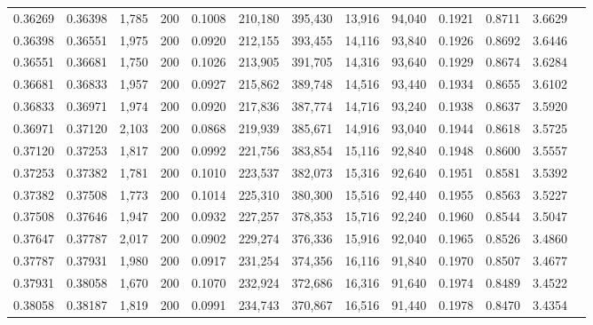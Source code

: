 \begin{tabular}{rrrrrrrrrrrrr}
0.36269 & 0.36398 & 1,785 & 200 &                                     0.1008 & 210,180 & 395,430 &  13,916 &  94,040 & 0.1921 & 0.8711 & 3.6629 \\
0.36398 & 0.36551 & 1,975 & 200 &                                     0.0920 & 212,155 & 393,455 &  14,116 &  93,840 & 0.1926 & 0.8692 & 3.6446 \\
0.36551 & 0.36681 & 1,750 & 200 &                                     0.1026 & 213,905 & 391,705 &  14,316 &  93,640 & 0.1929 & 0.8674 & 3.6284 \\
0.36681 & 0.36833 & 1,957 & 200 &                                     0.0927 & 215,862 & 389,748 &  14,516 &  93,440 & 0.1934 & 0.8655 & 3.6102 \\
0.36833 & 0.36971 & 1,974 & 200 &                                     0.0920 & 217,836 & 387,774 &  14,716 &  93,240 & 0.1938 & 0.8637 & 3.5920 \\
0.36971 & 0.37120 & 2,103 & 200 &                                     0.0868 & 219,939 & 385,671 &  14,916 &  93,040 & 0.1944 & 0.8618 & 3.5725 \\
0.37120 & 0.37253 & 1,817 & 200 &                                     0.0992 & 221,756 & 383,854 &  15,116 &  92,840 & 0.1948 & 0.8600 & 3.5557 \\
0.37253 & 0.37382 & 1,781 & 200 &                                     0.1010 & 223,537 & 382,073 &  15,316 &  92,640 & 0.1951 & 0.8581 & 3.5392 \\
0.37382 & 0.37508 & 1,773 & 200 &                                     0.1014 & 225,310 & 380,300 &  15,516 &  92,440 & 0.1955 & 0.8563 & 3.5227 \\
0.37508 & 0.37646 & 1,947 & 200 &                                     0.0932 & 227,257 & 378,353 &  15,716 &  92,240 & 0.1960 & 0.8544 & 3.5047 \\
0.37647 & 0.37787 & 2,017 & 200 &                                     0.0902 & 229,274 & 376,336 &  15,916 &  92,040 & 0.1965 & 0.8526 & 3.4860 \\
0.37787 & 0.37931 & 1,980 & 200 &                                     0.0917 & 231,254 & 374,356 &  16,116 &  91,840 & 0.1970 & 0.8507 & 3.4677 \\
0.37931 & 0.38058 & 1,670 & 200 &                                     0.1070 & 232,924 & 372,686 &  16,316 &  91,640 & 0.1974 & 0.8489 & 3.4522 \\
0.38058 & 0.38187 & 1,819 & 200 &                                     0.0991 & 234,743 & 370,867 &  16,516 &  91,440 & 0.1978 & 0.8470 & 3.4354 \\

\end{tabular}

